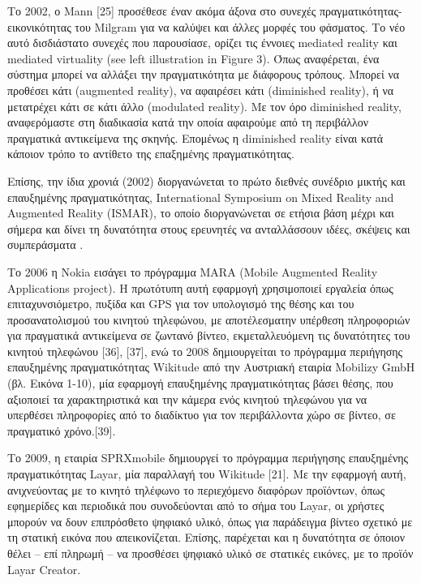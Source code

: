 Το 2002, ο Mann [25] προσέθεσε έναν ακόμα άξονα στο συνεχές πραγματικότητας-εικονικότητας του Milgram για να καλύψει και άλλες μορφές του φάσματος. Το νέο αυτό δισδιάστατο συνεχές που παρουσίασε, ορίζει τις έννοιες mediated reality και mediated virtuality (see left illustration in Figure 3). Όπως αναφέρεται, ένα σύστημα μπορεί να αλλάξει την πραγματικότητα με διάφορους τρόπους. Μπορεί να προθέσει κάτι (augmented reality), να αφαιρέσει κάτι (diminished reality), ή να μετατρέχει κάτι σε κάτι άλλο (modulated reality). Με τον όρο diminished reality, αναφερόμαστε στη διαδικασία κατά την οποία αφαιρούμε από τη περιβάλλον πραγματικά αντικείμενα της σκηνής. Επομένως η diminished reality είναι κατά κάποιον τρόπο το αντίθετο της επαξημένης πραγματικότητας. 

Επίσης, την ίδια χρονιά (2002) διοργανώνεται το πρώτο διεθνές συνέδριο μικτής και επαυξημένης πραγματικότητας, International Symposium on Mixed Reality and Augmented Reality (ISMAR), το οποίο διοργανώνεται σε ετήσια βάση μέχρι και σήμερα και δίνει τη δυνατότητα στους ερευνητές να ανταλλάσσουν ιδέες, σκέψεις και συμπεράσματα \cite{ismar}.


Το 2006 η Nokia εισάγει το πρόγραμμα MARA (Mobile Augmented Reality Applications project). H πρωτότυπη αυτή εφαρμογή χρησιμοποιεί εργαλεία όπως επιταχυνσιόμετρο, πυξίδα και GPS για τον υπολογισμό της θέσης και του προσανατολισμού του κινητού τηλεφώνου, με αποτέλεσματην υπέρθεση πληροφοριών για πραγματικά αντικείμενα σε ζωντανό βίντεο, εκμεταλλευόμενη τις δυνατότητες του κινητού τηλεφώνου [36], [37], ενώ το 2008 δημιουργείται το πρόγραμμα περιήγησης επαυξημένης πραγματικότητας Wikitude από την Αυστριακή εταιρία Mobilizy GmbH (βλ. Εικόνα 1-10), μία εφαρμογή επαυξημένης πραγματικότητας βάσει θέσης, που αξιοποιεί τα χαρακτηριστικά και την κάμερα ενός κινητού τηλεφώνου για να υπερθέσει πληροφορίες από το διαδίκτυο για τον περιβάλλοντα χώρο σε βίντεο, σε πραγματικό χρόνο.[39].

Το 2009, η εταιρία SPRXmobile δημιουργεί το πρόγραμμα περιήγησης επαυξημένης πραγματικότητας Layar, μία παραλλαγή του Wikitude [21]. Με την εφαρμογή αυτή, ανιχνεύοντας με το κινητό τηλέφωνο το περιεχόμενο διαφόρων προϊόντων, όπως εφημερίδες και περιοδικά που συνοδεύονται από το σήμα του Layar, οι χρήστες μπορούν να δουν επιπρόσθετο ψηφιακό υλικό, όπως για παράδειγμα βίντεο σχετικό με τη στατική εικόνα που απεικονίζεται. Επίσης, παρέχεται και η δυνατότητα σε όποιον θέλει – επί πληρωμή – να προσθέσει ψηφιακό υλικό σε στατικές εικόνες, με το προϊόν Layar Creator.


